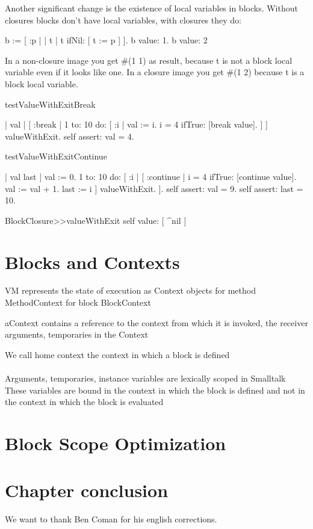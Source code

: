 \documentclass[a4paper,10pt,twoside]{book}
\begin{document}
Another significant change is the existence of local variables in blocks. 
Without closures blocks don't have local variables, with closures they do: 

\begin{code}{}
b := [ :p |
	| t |
	t ifNil: [ t := p ] ].
{ b value: 1. b value: 2 }
\end{code}

In a non-closure image you get \#(1 1) as result, because t is not a block 
local variable even if it looks like one. In a closure image you get \#(1 2)
because t is a block local variable. 

\begin{code}{}
testValueWithExitBreak

	| val |	
	[ :break |
	    1 to: 10 do: [ :i |
			val := i.
			i = 4 ifTrue: [break value].
		] 
	] valueWithExit.
	self assert: val = 4.



testValueWithExitContinue

	| val last |	
	val := 0. 
	1 to: 10 do: [ :i |
		[ :continue |
			i = 4 ifTrue: [continue value].
			val := val + 1.
			last := i
		] valueWithExit.
	].
	self assert: val = 9.
	self assert: last = 10.	

BlockClosure>>valueWithExit 
	  self value: [ ^nil ]
\end{code}


\section{Blocks and Contexts}


VM represents the state of execution as Context objects
for method MethodContext
for block BlockContext

aContext contains a reference to the context from which it is invoked, the receiver arguments, temporaries in the Context

We call home context the context in which a block is defined


\paragraph{}
Arguments, temporaries, instance variables are lexically scoped in Smalltalk
These variables are bound in the context in which the block is defined and not in the context in which the block is evaluated




\section{Block Scope Optimization}


\section{Chapter conclusion}


We want to thank Ben Coman for his english corrections.
\ifx\wholebook\relax\else
   
   
\end{document}
